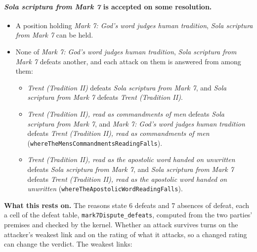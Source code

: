 \documentclass[11pt]{article}
\begin{document}
\paragraph{\emph{Sola scriptura from Mark 7} is accepted on some resolution.}
\begin{itemize}
\item A position holding \emph{Mark 7: God’s word judges human tradition}, \emph{Sola scriptura from Mark 7} can be held.
\item None of \emph{Mark 7: God’s word judges human tradition}, \emph{Sola scriptura from Mark 7} defeats another, and each attack on them is answered from among them:
\begin{itemize}
\item \emph{Trent (Tradition II)} defeats \emph{Sola scriptura from Mark 7}, and \emph{Sola scriptura from Mark 7} defeats \emph{Trent (Tradition II)}.
\item \emph{Trent (Tradition II), read as commandments of men} defeats \emph{Sola scriptura from Mark 7}, and \emph{Mark 7: God’s word judges human tradition} defeats \emph{Trent (Tradition II), read as commandments of men} (\texttt{where\allowbreak{}The\allowbreak{}Mens\allowbreak{}Commandments\allowbreak{}Reading\allowbreak{}Falls}).
\item \emph{Trent (Tradition II), read as the apostolic word handed on unwritten} defeats \emph{Sola scriptura from Mark 7}, and \emph{Sola scriptura from Mark 7} defeats \emph{Trent (Tradition II), read as the apostolic word handed on unwritten} (\texttt{where\allowbreak{}The\allowbreak{}Apostolic\allowbreak{}Word\allowbreak{}Reading\allowbreak{}Falls}).
\end{itemize}
\end{itemize}
\par\noindent\textbf{What this rests on.} The reasons state 6 defeats and 7 absences of defeat, each a cell of the defeat table, \texttt{mark7\allowbreak{}Dispute\_\allowbreak{}defeats}, computed from the two parties' premises and checked by the kernel. Whether an attack survives turns on the attacker's weakest link and on the rating of what it attacks, so a changed rating can change the verdict. The weakest links:
\end{document}

